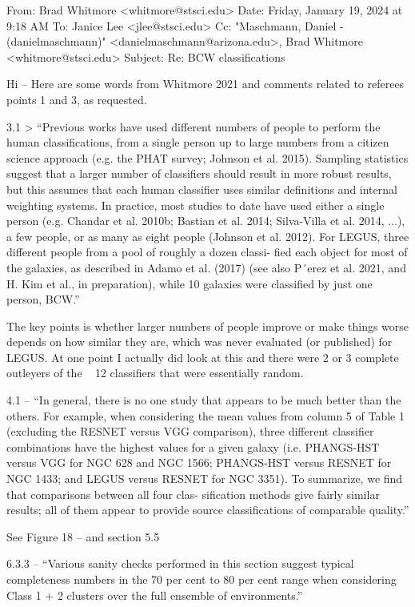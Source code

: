 

From: Brad Whitmore <whitmore@stsci.edu>
Date: Friday, January 19, 2024 at 9:18 AM
To: Janice Lee <jlee@stsci.edu>
Cc: "Maschmann, Daniel - (danielmaschmann)" <danielmaschmann@arizona.edu>, Brad Whitmore <whitmore@stsci.edu>
Subject: Re: BCW classifications

Hi – Here are some words from Whitmore 2021 and comments related to referees points 1 and 3, as requested. 

3.1 > “Previous works have used different numbers of people to perform
the human classifications, from a single person up to large numbers
from a citizen science approach (e.g. the PHAT survey; Johnson et al.
2015). Sampling statistics suggest that a larger number of classifiers
should result in more robust results, but this assumes that each human
classifier uses similar definitions and internal weighting systems. In
practice, most studies to date have used either a single person (e.g.
Chandar et al. 2010b; Bastian et al. 2014; Silva-Villa et al. 2014, ...),
a few people, or as many as eight people (Johnson et al. 2012). For
LEGUS, three different people from a pool of roughly a dozen classi-
fied each object for most of the galaxies, as described in Adamo et al.
(2017) (see also P´erez et al. 2021, and H. Kim et al., in preparation),
while 10 galaxies were classified by just one person, BCW.”

The key points is whether larger numbers of people improve or make things worse depends on how similar they are, which was never evaluated (or published) for LEGUS. At one point I actually did look at this and there were 2 or 3 complete outleyers of the ~ 12 classifiers that were essentially random. 

4.1 – “In general, there is no one study that appears to be much better
than the others. For example, when considering the mean values
from column 5 of Table 1 (excluding the RESNET versus VGG
comparison), three different classifier combinations have the highest
values for a given galaxy (i.e. PHANGS-HST versus VGG for NGC
628 and NGC 1566; PHANGS-HST versus RESNET for NGC 1433;
and LEGUS versus RESNET for NGC 3351).
To summarize, we find that comparisons between all four clas-
sification methods give fairly similar results; all of them appear to
provide source classifications of comparable quality.”

See Figure 18 – and section 5.5

6.3.3 – “Various sanity checks performed in
this section suggest typical completeness numbers in the 70 per cent
to 80 per cent range when considering Class 1 + 2 clusters over the
full ensemble of environments.”

